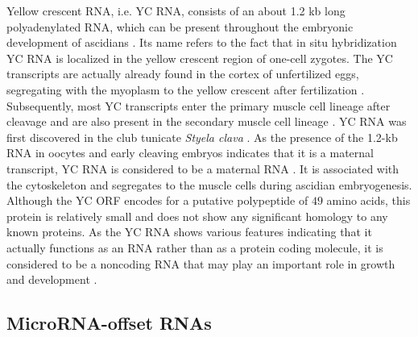 \documentclass[graybox]{svmult}
\begin{document}
Yellow crescent RNA, i.e. YC RNA, consists of an about 1.2 kb long 
polyadenylated 
RNA, which can be present throughout the embryonic development of ascidians 
\cite{Swalla1995}. Its name refers to the fact that in situ hybridization YC 
RNA is localized in the yellow crescent region of one-cell 
zygotes. The YC transcripts are actually already found in the cortex of 
unfertilized eggs, segregating with the myoplasm to the yellow crescent after 
fertilization \cite{Swalla1995}. Subsequently, most YC transcripts enter the 
primary muscle cell lineage after cleavage and are also present in the 
secondary muscle cell lineage \cite{Swalla1995}. YC RNA was first 
discovered in the club tunicate \textit{Styela clava} \cite{Swalla1995}. As the 
presence 
of the 1.2-kb RNA in oocytes and early cleaving embryos indicates that it is a 
maternal transcript, YC RNA is considered to be a maternal RNA 
\cite{Swalla1995}. It is associated with the cytoskeleton and segregates to 
the muscle cells during ascidian embryogenesis. Although the YC ORF encodes for 
a putative polypeptide of $49$ amino acids, this protein is relatively small 
and does not show any significant homology to any known proteins. As the YC RNA 
shows various features indicating that it actually functions as an RNA rather 
than as a protein coding molecule, it is considered to be a noncoding RNA that 
may play an important role in growth and development \cite{Swalla1995}.

\subsection{MicroRNA-offset RNAs}
\end{document}
